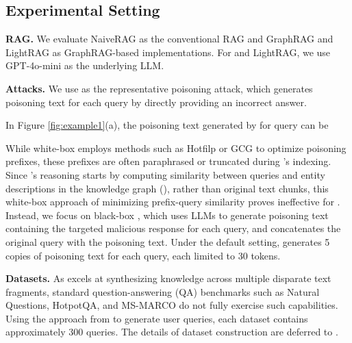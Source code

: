 \subsection{Experimental Setting} 

{\bf RAG.} We evaluate NaiveRAG as the conventional RAG and GraphRAG and LightRAG as GraphRAG-based implementations. For \rag and LightRAG, we use GPT-4o-mini as the underlying LLM. 

\vspace{2pt}
{\bf Attacks.} We use \prag{} as the representative poisoning attack, which generates poisoning text for each query by directly providing an incorrect answer. 
\begin{mtbox}{}
\begin{example}
\label{sec:prag}
In Figure \ref{fig:example1}(a), the poisoning text generated by \prag for query  can be 
\end{example}
\end{mtbox}
While white-box \prag employs methods such as Hotfilp or GCG to optimize poisoning prefixes, these prefixes are often paraphrased or truncated during \rag's indexing. Since \rag's reasoning starts by computing similarity between queries and entity descriptions in the knowledge graph (), rather than original text chunks, this white-box approach of minimizing prefix-query similarity proves ineffective for \rag. Instead, we focus on black-box \prag, which uses LLMs to generate poisoning text containing the targeted malicious response for each query, and concatenates the original query with the poisoning text. Under the default setting, \prag generates 5 copies of poisoning text for each query, each limited to 30 tokens.

\vspace{2pt}
{\bf Datasets.} As \rag excels at synthesizing knowledge across multiple disparate text fragments, standard question-answering (QA) benchmarks such as Natural Questions, HotpotQA, and MS-MARCO do not fully exercise such capabilities. 
Using the approach from to generate user queries, each dataset contains approximately 300 queries. The details of dataset construction are deferred to . 


